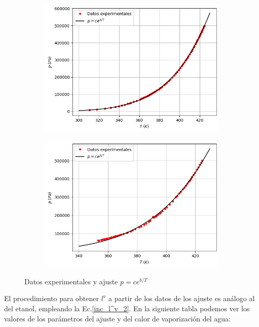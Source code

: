 \documentclass[a4paper,12pt,titlepage]{article}
\begin{document}
\begin{figure}[h!]
    \centering
    \begin{subfigure}{0.49\textwidth}
        \centering
        \includegraphics[width=1.02\linewidth]{ELV simple/curva_c_agua.png}
    \end{subfigure}
    \begin{subfigure}{0.49\textwidth}
        \centering
        \includegraphics[width=1.02\linewidth]{ELV simple/curva_e_agua.png}
    \end{subfigure}
    \caption{Datos experimentales y ajuste $p=ce^{b/T}$}
    \label{fig:enter-label}
\end{figure}

El procedimiento para obtener $l^v$ a partir de los datos de los ajuste es análogo al del etanol, empleando la Ec.\ref{inc_l^v_2}. En la siguiente tabla podemos ver los valores de los parámetros del ajuste y del calor de vaporización del agua:
\end{document}
